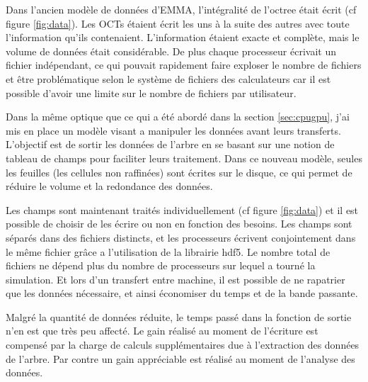 
Dans l'ancien modèle de données d'EMMA, l'intégralité de l'octree était écrit (cf figure \ref{fig:data}).
Les OCTs étaient écrit les uns à la suite des autres avec toute l'information qu'ils contenaient.
L'information étaient exacte et complète, mais le volume de données était considérable.
De plus chaque processeur écrivait un fichier indépendant, ce qui pouvait rapidement faire exploser le nombre de fichiers et être problématique selon le système de fichiers des calculateurs car il est possible d'avoir une limite sur le nombre de fichiers par utilisateur.

Dans la même optique que ce qui a été abordé dans la section \ref{sec:cpugpu}, j'ai mis en place un modèle visant a manipuler les données avant leurs transferts.
L'objectif est de sortir les données de l'arbre en se basant sur une notion de tableau de champs pour faciliter leurs traitement.
Dans ce nouveau modèle, seules les feuilles (les cellules non raffinées) sont écrites sur le disque, ce qui permet de réduire le volume et la redondance des données.

Les champs sont maintenant traités individuellement (cf figure \ref{fig:data}) et il est possible de choisir de les écrire ou non en fonction des besoins.
Les champs sont séparés dans des fichiers distincts, et les processeurs écrivent conjointement dans le même fichier grâce a l'utilisation de la librairie hdf5.
Le nombre total de fichiers ne dépend plus du nombre de processeurs sur lequel a tourné la simulation.
Et lors d'un transfert entre machine, il est possible de ne rapatrier que les données nécessaire, et ainsi économiser du temps et de la bande passante.

Malgré la quantité de données réduite, le temps passé dans la fonction de sortie n'en est que très peu affecté.
Le gain réalisé au moment de l'écriture est compensé par la charge de calculs supplémentaires due à l'extraction des données de l'arbre.
Par contre un gain appréciable est réalisé au moment de l'analyse des données.

